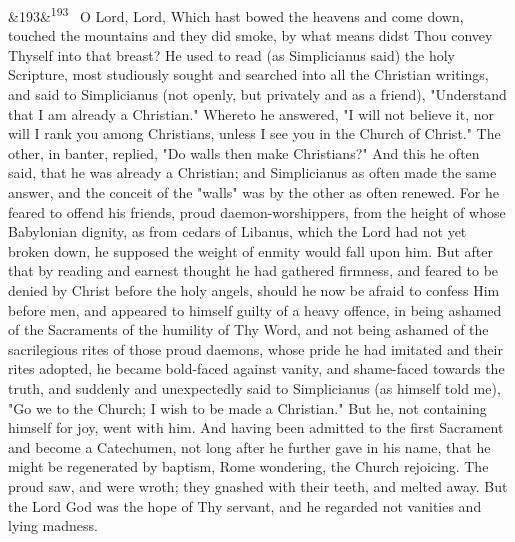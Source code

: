 \documentclass[12pt]{article}
\newcommand{\para}[1][]{\par\noindent\ifx&#1&\else\textsuperscript{\footnotesize #1}~\fi}
\begin{document}
\para[193] O Lord, Lord, Which hast bowed the heavens and come down, touched the mountains and they did smoke, by what means didst Thou convey Thyself into that breast? He used to read (as Simplicianus said) the holy Scripture, most studiously sought and searched into all the Christian writings, and said to Simplicianus (not openly, but privately and as a friend), "Understand that I am already a Christian." Whereto he answered, "I will not believe it, nor will I rank you among Christians, unless I see you in the Church of Christ." The other, in banter, replied, "Do walls then make Christians?" And this he often said, that he was already a Christian; and Simplicianus as often made the same answer, and the conceit of the "walls" was by the other as often renewed. For he feared to offend his friends, proud daemon-worshippers, from the height of whose Babylonian dignity, as from cedars of Libanus, which the Lord had not yet broken down, he supposed the weight of enmity would fall upon him. But after that by reading and earnest thought he had gathered firmness, and feared to be denied by Christ before the holy angels, should he now be afraid to confess Him before men, and appeared to himself guilty of a heavy offence, in being ashamed of the Sacraments of the humility of Thy Word, and not being ashamed of the sacrilegious rites of those proud daemons, whose pride he had imitated and their rites adopted, he became bold-faced against vanity, and shame-faced towards the truth, and suddenly and unexpectedly said to Simplicianus (as himself told me), "Go we to the Church; I wish to be made a Christian." But he, not containing himself for joy, went with him. And having been admitted to the first Sacrament and become a Catechumen, not long after he further gave in his name, that he might be regenerated by baptism, Rome wondering, the Church rejoicing. The proud saw, and were wroth; they gnashed with their teeth, and melted away. But the Lord God was the hope of Thy servant, and he regarded not vanities and lying madness.
\end{document}
